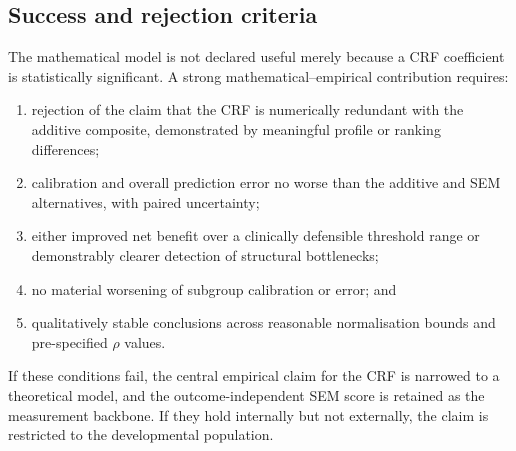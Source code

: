 \subsection{Success and rejection criteria}
The mathematical model is not declared useful merely because a CRF coefficient is
statistically significant. A strong mathematical--empirical contribution requires:
\begin{enumerate}
 \item rejection of the claim that the CRF is numerically redundant with the
 additive composite, demonstrated by meaningful profile or ranking differences;
 \item calibration and overall prediction error no worse than the additive and SEM
 alternatives, with paired uncertainty;
 \item either improved net benefit \citep{vickers_elkin_2006} over a clinically defensible threshold range or
 demonstrably clearer detection of structural bottlenecks;
 \item no material worsening of subgroup calibration or error; and
 \item qualitatively stable conclusions across reasonable normalisation bounds and
 pre-specified $\rho$ values.
\end{enumerate}
If these conditions fail, the central empirical claim for the CRF is narrowed to a
theoretical model, and the outcome-independent SEM score is retained as the
measurement backbone. If they hold internally but not externally, the claim is
restricted to the developmental population.


